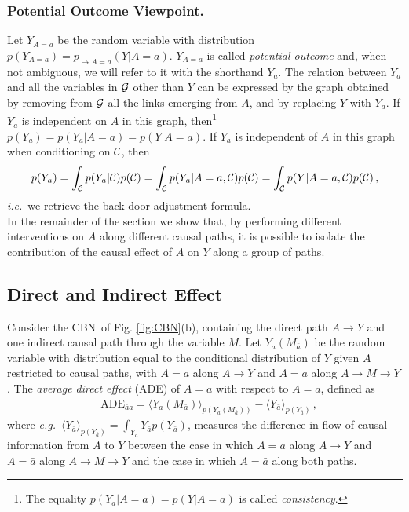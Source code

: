 \documentclass[runningheads]{llncs}
\newcommand{\figref}[1]{Fig. \ref{#1}}
\newcommand{\av}[1]{\langle #1 \rangle}
\newcommand{\ie}{\emph{i.e.}}
\newcommand{\eg}{\emph{e.g.}}
\newcommand{\CBN}{CBN}
\begin{document}
\subsubsection*{Potential Outcome Viewpoint.}
Let $Y_{A=a}$ be the random variable with distribution $p(Y_{A=a}) = p_{\rightarrow A=a}(Y|A=a)$. $Y_{A=a}$ is called \emph{potential outcome} and, when not ambiguous, we will refer to it with the shorthand $Y_a$. The relation between $Y_{a}$ and all the variables in ${\cal G}$ other than $Y$ can be expressed by the graph  
obtained by removing from ${\cal G}$ all the links emerging from $A$, and by replacing $Y$ with $Y_{a}$. If $Y_{a}$ is independent on $A$ in this graph, then\footnote{The equality $p(Y_a|A=a)=p(Y|A=a)$ is called \emph{consistency}.} $p(Y_a)=p(Y_a|A=a)=p(Y|A=a)$. If $Y_{a}$ is independent of $A$ in this graph when conditioning on ${\cal C}$, then 
\begin{align*}
p(Y_{a}) = \int_{{\cal C}} p(Y_{a}|{\cal C}) p({\cal C}) = \int_{{\cal C}} p(Y_{a}|A=a,{\cal C}) p({\cal C}) = \int_{{\cal C}} p(Y|A=a,{\cal C}) p({\cal C}) \,,
\end{align*}
\ie~we retrieve the back-door adjustment formula.\\

In the remainder of the section we show that, by performing different interventions on $A$ along different causal paths, it is possible to isolate the contribution of the causal effect of $A$ on $Y$ along a group of paths. 

\subsection*{Direct and Indirect Effect}
Consider the \CBN~of \figref{fig:CBN}(b), containing the direct path $A\rightarrow Y$ and one indirect causal path through the variable $M$. Let $Y_{a}(M_{\bar a})$ be the %
random variable with distribution equal to the conditional distribution of $Y$ given $A$ restricted to causal paths, with $A=a$ along $A\rightarrow Y$ and $A=\bar a$ along $A\rightarrow M\rightarrow Y$. 
The \emph{average direct effect} (ADE) of $A=a$ with respect to $A=\bar a$, defined as
\begin{align*}
&\textrm{ADE}_{\bar a a } =\av{Y_{a}(M_{\bar a})}_{p(Y_{a}(M_{\bar a}))} - \av{Y_{\bar a}}_{p(Y_{\bar a})}\,,
\end{align*}
where \eg~$\av{Y_{\bar a}}_{p(Y_{\bar a})}=\int_{Y_{\bar a}} Y_{\bar a}p(Y_{\bar a})$, measures the difference in flow of causal information from $A$ to $Y$ between the case in which $A=a$ along $A\rightarrow Y$ and $A=\bar a$ along $A\rightarrow M\rightarrow Y$ and the case in which $A=\bar a$ along both paths. 
\end{document}
